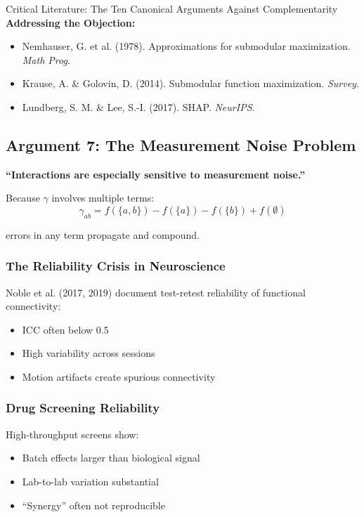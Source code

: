 \begin{chapter}{Critical Literature: The Ten Canonical Arguments Against Complementarity}
\textbf{Addressing the Objection:}
\begin{itemize}[noitemsep]
    \item Nemhauser, G. et al. (1978). Approximations for submodular maximization. \textit{Math Prog}.
    \item Krause, A. \& Golovin, D. (2014). Submodular function maximization. \textit{Survey}.
    \item Lundberg, S. M. \& Lee, S.-I. (2017). SHAP. \textit{NeurIPS}.
\end{itemize}

\subsection{Argument 7: The Measurement Noise Problem}
\label{sec:arg-noise}

\begin{tcolorbox}[colback=red!5!white,colframe=red!75!black,title=\textbf{Core Claim}]
\textbf{``Interactions are especially sensitive to measurement noise.''}

Because $\gamma$ involves multiple terms:
\[
\gamma_{ab} = f(\{a,b\}) - f(\{a\}) - f(\{b\}) + f(\emptyset)
\]

errors in any term propagate and compound.
\end{tcolorbox}

\subsubsection{The Reliability Crisis in Neuroscience}

Noble et al. (2017, 2019) document test-retest reliability of functional connectivity:
\begin{itemize}[noitemsep]
    \item ICC often below 0.5
    \item High variability across sessions
    \item Motion artifacts create spurious connectivity
\end{itemize}

\subsubsection{Drug Screening Reliability}

High-throughput screens show:
\begin{itemize}[noitemsep]
    \item Batch effects larger than biological signal
    \item Lab-to-lab variation substantial
    \item ``Synergy'' often not reproducible
\end{itemize}


\end{chapter}
